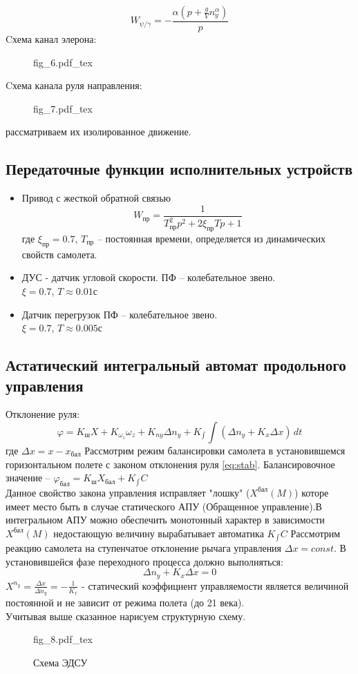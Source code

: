 \documentclass{article}
\begin{document}
\[
W_{\psi/\gamma} = -\frac{\alpha(p + \frac{g}{V} n_y^\alpha)} {p}
\]
Cхема канал элерона:
\begin{figure}[ht]
{fig_6.pdf_tex}
\end{figure}
Cхема канала руля направления:
\begin{figure}[ht]
{fig_7.pdf_tex}
\end{figure}
рассматриваем их изолированное движение.

\subsection{Передаточные функции исполнительных устройств}
\begin{itemize}
\item Привод с жесткой обратной связью
\[
W_{пр} = \frac{1}{T_{пр}^2p^2 + 2 \xi_{пр} Tp + 1}
\]
где $\xi_{пр} = 0.7$, $T_{пр}$ -- постоянная времени, определяется из динамических свойств самолета.

\item ДУС - датчик угловой скорости.
ПФ -- колебательное звено.\\
$\xi = 0.7$, $T \approx 0.01 с$

\item Датчик перегрузок 
ПФ -- колебательное звено.\\
$\xi = 0.7$, $T \approx 0.005 с$
\end{itemize}

\subsection{Астатический интегральный автомат продольного управления}
Отклонение руля:
\begin{equation}
\varphi = K_ш X + K_{\omega_z} \omega_z + K_{ny} \Delta n_y + K_{\int} \int (\Delta n_y + K_x \Delta x) \, dt
\label{eq:stab}
\end{equation}
где $\Delta x = x - x_{бал}$
Рассмотрим режим балансировки самолета в установившемся горизонтальном полете с законом отклонения руля \eqref{eq:stab}.
Балансировочное значение -- $\varphi_{бал} = K_ш X_{бал} + K_{\int} C$\\
Данное свойство закона управления исправляет "лошку" ($X^{бал}(M)$) которе имеет место быть в случае статического АПУ (Обращенное управление).В интегральном АПУ можно обеспечить монотонный характер в зависимости $X^{бал} (M)$ недостающую величину вырабатывает автоматика $K_{\int}C$
Рассмотрим реакцию самолета на ступенчатое отклонение рычага управления $\Delta x = const$. В установившейся фазе переходного процесса должно выполняться:
\[
\Delta n_y + K_x \Delta x = 0
\]
$ X^{n_y} = \frac{\Delta x}{\Delta n_y} = -\frac{1}{K_x} $ - статический коэффициент управляемости является величиной постоянной и не зависит от режима полета (до 21 века). \\
Учитывая выше сказанное нарисуем структурную схему.\\ 
\begin{figure}[H]
\begin{minipage}{\textwidth}
{fig_8.pdf_tex}
\end{minipage}
\caption{Схема ЭДСУ}
\end{figure}
\end{document}
